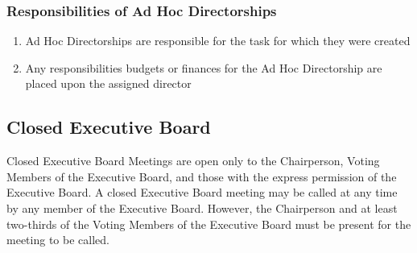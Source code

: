 \documentclass{article}
\newcommand{\asection}[1]{\subsection{#1} \label{#1}}
\newcommand{\asubsection}[1]{\subsubsection{#1} \label{#1}}
\begin{document}
\asubsection{Responsibilities of Ad Hoc Directorships}
\begin{enumerate}
	\item Ad Hoc Directorships are responsible for the task for which they were created
	\item Any responsibilities budgets or finances for the Ad Hoc Directorship are placed upon the assigned director
\end{enumerate}

\asection{Closed Executive Board}
Closed Executive Board Meetings are open only to the Chairperson, Voting Members of the Executive Board, and those with the express permission of the Executive Board.
A closed Executive Board meeting may be called at any time by any member of the Executive Board.
However, the Chairperson and at least two-thirds of the Voting Members of the Executive Board must be present for the meeting to be called.
\end{document}
